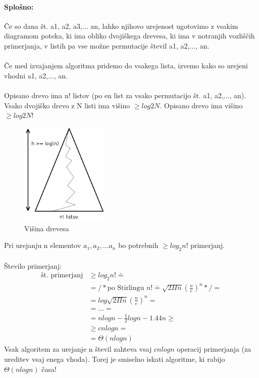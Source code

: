 \documentclass[a4paper,10pt]{article}
\begin{document}
\paragraph{Splo\v sno:}
\v Ce so dana \v st. a1, a2, a3,... an, lahko njihovo urejenost ugotovimo z vsakim diagramom poteka, ki ima obliko dvoji\v skega drevesa, ki ima v notranjih vozli\v s\v cih primerjanja, v listih pa vse mo\v zne permutacije \v stevil a1, a2,..., an.\\
\\
\v Ce med izvajanjem algoritma pridemo do vsakega lista, izvemo kako so urejeni vhodni a1, a2,..., an.\\
\\
Opisano drevo ima n! listov (po en list za vsako permutacijo \v st. a1, a2,..., an). Vsako dvoji\v sko drevo z N listi ima vi\v sino $\geq log2 N$. Opisano drevo ima vi\v sino $\geq log2 N!$
\begin{figure}[h]
	\centering
	\includegraphics[width=4.15cm,height=4.9cm]{Slike/VisinaDrevesaSkica.png}
	\caption{Vi\v sina drevesa}
\end{figure}
Pri urejanju n elementov $a_1, a_2,... a_n$ bo potrebnih $\geq log_2 n!$ primerjanj.\\
\\
\v Stevilo primerjanj:
$$
\begin{array}{ll}
\mbox{\v st. primerjanj} & \geq log_2 n! \doteq \\
 & = /* \mbox{po Stirlingu } n! \doteq \sqrt{2\Pi n} \left( \frac{n}{e} \right) ^n */ = \\
 & = log\sqrt{2\Pi n} \left( \frac{n}{e} \right) ^n = \\
 & = ... = \\
 & = n log n - \frac{1}{2}log n - 1.44n \geq \\
 & \geq c n log n = \\
 & = \Theta (n log n)
\end{array}
$$
Vsak algoritem za urejanje n \v stevil zahteva vsaj $c n log n$ operacij primerjanja (za ureditev vsaj enega vhoda). Torej je smiselno iskati algoritme, ki rabijo $\Theta (n log n)$ \v casa!
\end{document}
